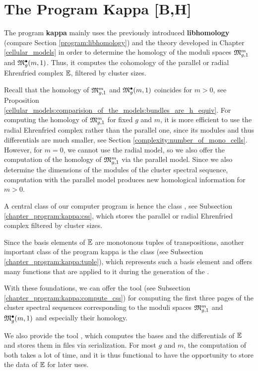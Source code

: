 \section{The Program Kappa [B,H]}
\label{chapter_program:kappa}

The program {\bf kappa} mainly uses the previously introduced {\bf libhomology} (compare Section \ref{program:libhomology}) 
and the theory developed in Chapter \ref{cellular_models}
in order to determine the homology of the moduli spaces $\Modspc[1]$ and $\ModspcRad[1]$. 
Thus, it computes the cohomology of the parallel or radial Ehrenfried complex $\Ehrprog$,
filtered by cluster sizes.

Recall that the homology of $\Modspc[1]$ and $\ModspcRad[1]$ coincides for $m > 0$, see Proposition \ref{cellular_models:comparision_of_the_models:bundles_are_h_equiv}.
For computing the homology of $\Modspc[1]$ for fixed $g$ and $m$, 
it is more efficient to use the radial Ehrenfried complex rather than the parallel one, 
since its modules and thus differentials are much smaller, see Section \ref{complexity:number_of_mono_cells}.
However, for $m = 0$, we cannot use the radial model, so we also offer the computation of the homology of $\Modspc[1]$ via the parallel model.
Since we also determine the dimensions of the modules of the cluster spectral sequence, 
computation with the parallel model produces new homological information for $m > 0$.

A central class of our computer program is hence the class , see Subsection \ref{chapter_program:kappa:css},
which stores the parallel or radial Ehrenfried complex filtered by cluster sizes.

Since the basis elements of $\Ehrprog$ are monotonous tuples of transpositions,
another important class of the program kappa is the class  (see Subsection \ref{chapter_program:kappa:tuple}),
which represents such a basis element and offers many functions that are applied to it
during the generation of the .

With these foundations, we can offer the tool  (see Subsection \ref{chapter_program:kappa:compute_css}) 
for computing the first three pages of the cluster spectral sequences corresponding to the moduli spaces $\Modspc[1]$ and $\ModspcRad[1]$
and especially their homology.

We also provide the tool ,
which computes the bases and the differentials of $\Ehrprog$ and stores them in files via serialization.
For most $g$ and $m$, 
the computation of both takes a lot of time,
and it is thus functional to have the opportunity to store the data of $\Ehrprog$ for later uses.

